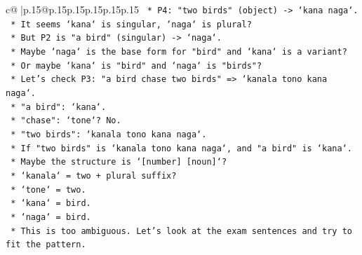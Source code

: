 \documentclass{article}
\begin{document}
{\begin{supertabular}{c@{$\;$}|p{.15\linewidth}@{}p{.15\linewidth}p{.15\linewidth}p{.15\linewidth}p{.15\linewidth}p{.15\linewidth}}
{{{\texttt{                                                                *   P4: "two birds" (object) {-}> `kana naga`.} \\
\texttt{                                                                *   It seems `kana` is singular, `naga` is plural?} \\
\texttt{                                                                *   But P2 is "a bird" (singular) {-}> `naga`.} \\
\texttt{                                                                *   Maybe `naga` is the base form for "bird" and `kana` is a variant?} \\
\texttt{                                                                *   Or maybe `kana` is "bird" and `naga` is "birds"?} \\
\texttt{                                                                *   Let's check P3: "a bird chase two birds" => `kanala tono kana naga`.} \\
\texttt{                                                                    *   "a bird": `kana`.} \\
\texttt{                                                                    *   "chase": `tone`? No.} \\
\texttt{                                                                    *   "two birds": `kanala tono kana naga`.} \\
\texttt{                                                                    *   If "two birds" is `kanala tono kana naga`, and "a bird" is `kana`.} \\
\texttt{                                                                    *   Maybe the structure is `{[}number{]} {[}noun{]}`?} \\
\texttt{                                                                    *   `kanala` = two + plural suffix?} \\
\texttt{                                                                    *   `tone` = two.} \\
\texttt{                                                                    *   `kana` = bird.} \\
\texttt{                                                                    *   `naga` = bird.} \\
\texttt{                                                                    *   This is too ambiguous. Let's look at the exam sentences and try to fit the pattern.} \\
}}}
\end{supertabular}}
\end{document}
